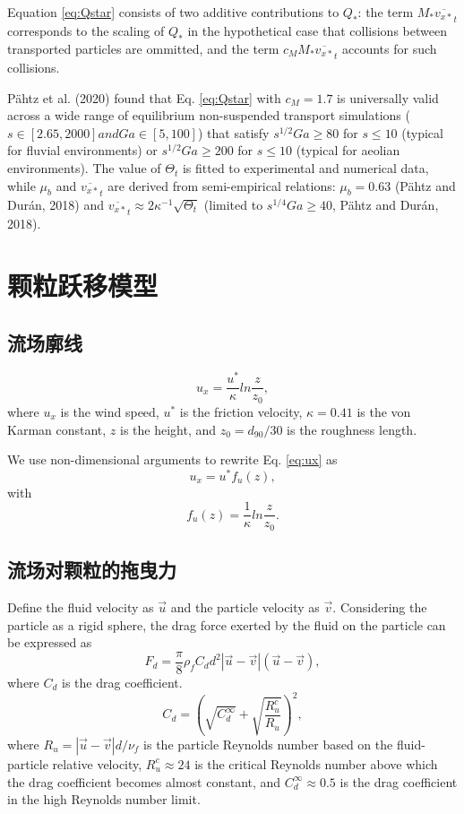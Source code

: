 \documentclass[12pt,a4paper]{article}
\begin{document}
Equation \ref{eq:Qstar} consists of two additive contributions to $Q_*$: the term $M_* \overline{v_{x*}}_t$ corresponds to the scaling of $Q_*$ in the hypothetical case that collisions between transported particles are ommitted, and the term $c_M M_* \overline{v_{x*}}_t$ accounts for such collisions.

P\"ahtz et al. (2020) found that Eq. \ref{eq:Qstar} with $c_M = 1.7$ is universally valid across a wide range of equilibrium non-suspended transport simulations ($s \in [2.65, 2000] and Ga \in [5, 100]$) that satisfy $s^{1/2} Ga \geq 80$ for $s \leq 10$ (typical for fluvial environments) or $s^{1/2} Ga \geq 200$ for $s \leq 10$ (typical for aeolian environments). The value of $\Theta_t$ is fitted to experimental and numerical data, while $\mu_b$ and $\overline{v_{x*}}_t$ are derived from semi-empirical relations: $\mu_b = 0.63$ (P\"ahtz and Dur\'an, 2018) and $\overline{v_{x*}}_t \approx 2 \kappa^{-1} \sqrt{\Theta_t}$ (limited to $s^{1/4} Ga \geq 40$, P\"ahtz and Dur\'an, 2018).

\section{颗粒跃移模型}
\subsection{流场廓线}
\begin{equation}
    u_x = \frac{u^*}{\kappa}ln\frac{z}{z_0} \label{eq:ux},
\end{equation}
where $u_x$ is the wind speed, $u^*$ is the friction velocity, $\kappa = 0.41$ is the von Karman constant, $z$ is the height, and $z_0=d_{90}/30$ is the roughness length.

We use non-dimensional arguments to rewrite Eq. \ref{eq:ux} as
\begin{equation}
    u_x = u^* f_u(z),
\end{equation}
with
\begin{equation}
    f_u(z) = \frac{1}{\kappa}ln\frac{z}{z_0}.
\end{equation}
\subsection{流场对颗粒的拖曳力}
Define the fluid velocity as $\vec{u}$ and the particle velocity as $\vec{v}$. Considering the particle as a rigid sphere, the drag force exerted by the fluid on the particle can be expressed as
\begin{equation}
    F_d = \frac{\pi}{8} \rho_f C_d d^2 |\vec{u} - \vec{v}| (\vec{u} - \vec{v}),
\end{equation}
where $C_d$ is the drag coefficient.
\begin{equation}
    C_d = \left(\sqrt{C_d^\infty} + \sqrt{\frac{R_u^c}{R_u}}\right)^2,
\end{equation}
where $R_u=|\vec{u} - \vec{v}|d/\nu_f$ is the particle Reynolds number based on the fluid-particle relative velocity, $R_u^c \approx 24$ is the critical Reynolds number above which the drag coefficient becomes almost constant, and $C_d^\infty \approx 0.5$ is the drag coefficient in the high Reynolds number limit.
\end{document}
